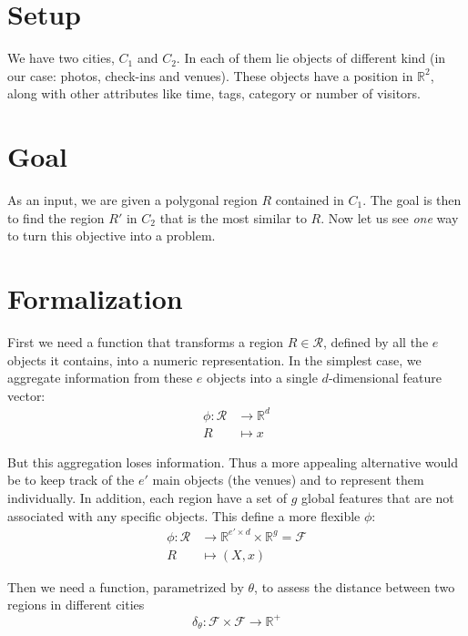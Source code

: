 \documentclass[a4paper,11pt,draft]{scrartcl}
\begin{document}
\section*{Setup}
We have two cities, $C_1$ and $C_2$. In each of them lie objects of different
kind (in our case: photos, check-ins and venues). These objects have a
position in $\mathbb{R}^2$, along with other attributes like time, tags,
category or number of visitors.

\section*{Goal}
As an input, we are given a polygonal region $R$ contained in $C_1$.
The goal is then to find the region $R'$ in $C_2$ that is the most similar to
$R$.
Now let us see \emph{one} way to turn this objective into a problem.

\section*{Formalization}

First we need a function that transforms a region $R \in \mathcal{R}$, defined
by all the $e$ objects it contains, into a numeric representation. In the
simplest case, we aggregate information from these $e$ objects into a single
$d$-dimensional feature vector:
\begin{align*}
	\phi \colon \mathcal{R} &\to \mathbb{R}^d \\
	R &\mapsto x
\end{align*}

But this aggregation loses information. Thus a more appealing alternative
would be to keep track of the $e'$ main objects (the venues) and to represent
them individually. In addition, each region have a set of $g$ global features
that are not associated with any specific objects. This define a more flexible
$\phi$:
\begin{align*}
	\phi \colon \mathcal{R} &\to
	\mathbb{R}^{e'\times d} \times \mathbb{R}^g = \mathcal{F} \\
	R &\mapsto (X, x)
\end{align*}

Then we need a function, parametrized by $\theta$, to assess the distance
between two regions in different cities
\[
	\delta_{\theta} \colon \mathcal{F} \times \mathcal{F} \to \mathbb{R}^+
\]
\end{document}
